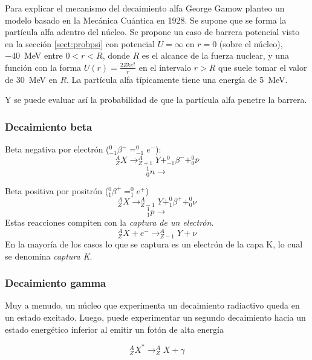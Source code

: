 \documentclass[10pt,twocolumn,titlepage]{article}
\begin{document}
Para explicar el mecanismo del decaimiento alfa George Gamow planteo un modelo basado en la Mecánica Cuántica en 1928. Se supone que se forma la partícula alfa adentro del núcleo. Se propone un caso de barrera potencial visto en la sección \ref{sect:probpsi} con potencial $U=\infty$ en $r=0$ (sobre el núcleo), \SI{-40}{\MeV} entre $0<r< R$, donde $R$ es el alcance de la fuerza nuclear, y una función con la forma $U(r)=\frac{2Zke^2}{r}$ en el intervalo $r>R$ que suele tomar el valor de \SI{30}{\MeV} en $R$. La partícula alfa típicamente tiene una energía de \SI{5}{\MeV}.

Y se puede evaluar así la probabilidad de que la partícula alfa penetre la barrera.


\subsubsection*{Decaimiento beta}
Beta negativa por electrón ($^0_{-1}\beta^-=^0_{-1}e^-$):
$$^A_ZX\rightarrow ^A_{Z+1}Y+_{-1}^0\beta^- +^0_0\bar{\nu}$$
$$^1_0n \rightarrow$$

Beta positiva por positrón ($^0_{1}\beta^+ =^0_1e^+$)
$$^A_ZX\rightarrow ^A_{Z-1}Y+^0_{1}\beta^+ +^0_0\nu$$
$$^1_1p\rightarrow $$
Estas reacciones compiten con la \emph{captura de un electrón}.
$$^A_ZX+e^{-}\rightarrow ^A_{Z-1}Y+\nu $$
En la mayoría de los casos lo que se captura es un electrón de la capa K, lo cual se denomina \emph{captura K}.
\subsubsection*{Decaimiento gamma}
Muy a menudo, un núcleo que experimenta un decaimiento radiactivo queda en un estado excitado. Luego, puede experimentar un segundo decaimiento hacia un estado energético inferior al emitir un fotón de alta energía

$$ ^A_ZX^*\rightarrow ^A_ZX+\gamma $$
\end{document}
